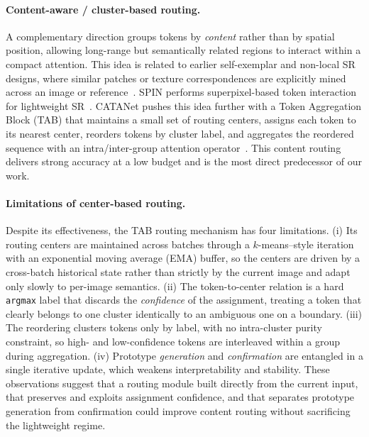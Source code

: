 \paragraph{Content-aware / cluster-based routing.}
A complementary direction groups tokens by \emph{content} rather than by spatial
position, allowing long-range but semantically related regions to interact within a
compact attention. This idea is related to earlier self-exemplar and non-local
SR designs, where similar patches or texture correspondences are explicitly
mined across an image or reference~\cite{glasner2009single,mei2020csnln,yang2020ttn}.
SPIN performs superpixel-based token interaction for lightweight
SR~\cite{zhang2024spin}. CATANet pushes this idea further with a Token
Aggregation Block (TAB) that maintains a small set of routing centers, assigns
each token to its nearest center, reorders tokens by cluster label, and aggregates
the reordered sequence with an intra/inter-group attention
operator~\cite{liu2025catanet}. This content routing delivers strong accuracy at
a low budget and is the most direct predecessor of our work.

\paragraph{Limitations of center-based routing.}
Despite its effectiveness, the TAB routing mechanism has four limitations.
(i) Its routing centers are maintained across batches through a $k$-means--style
iteration with an exponential moving average (EMA) buffer, so the centers are
driven by a cross-batch historical state rather than strictly by the current
image and adapt only slowly to per-image semantics. (ii) The token-to-center
relation is a hard \texttt{argmax} label that discards the \emph{confidence} of
the assignment, treating a token that clearly belongs to one cluster identically
to an ambiguous one on a boundary. (iii) The reordering clusters tokens only by
label, with no intra-cluster purity constraint, so high- and low-confidence tokens
are interleaved within a group during aggregation. (iv) Prototype \emph{generation}
and \emph{confirmation} are entangled in a single iterative update, which weakens
interpretability and stability. These observations suggest that a routing module
built directly from the current input, that preserves and exploits assignment
confidence, and that separates prototype generation from confirmation could
improve content routing without sacrificing the lightweight regime.

